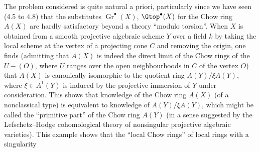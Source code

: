 The problem considered is quite natural a priori, particularly since we have seen (4.5 to 4.8) that the substitutes $\operatorname{Gr}^\bullet(X)$, $\Gtop^\bullet(X)$ for the Chow ring $A(X)$ are hardly satisfactory beyond a theory ``modulo torsion''. When $X$ is obtained from a smooth projective algebraic scheme $Y$ over a field $k$ by taking the local scheme at the vertex of a projecting cone $C$ and removing the origin, one finds (admitting that $A(X)$ is indeed the direct limit of the Chow rings of the $U-(O)$, where $U$ ranges over the open neighbourhoods in $C$ of the vertex $O$) that $A(X)$ is canonically isomorphic to the quotient ring $A(Y)/\xi A(Y)$, where $\xi\in A^1(Y)$ is induced by the projective immersion of $Y$ under consideration. This shows that knowledge of the Chow ring $A(X)$ (of a nonclassical type) is equivalent to knowledge of $A(Y)/\xi A(Y)$, which might be called the ``primitive part'' of the Chow ring $A(Y)$ (in a sense suggested by the Lefschetz--Hodge cohomological theory of nonsingular projective algebraic varieties). This example shows that the ``local Chow rings'' of local rings with a singularity
